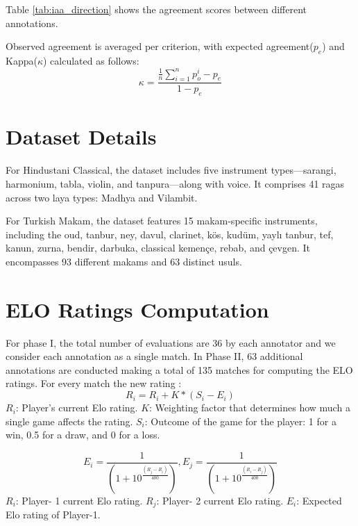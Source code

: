Table \ref{tab:iaa_direction} shows the agreement scores between different annotations.


Observed agreement is averaged per criterion, with expected agreement(\(p_e\)) and Kappa(\(\kappa\)) calculated as follows:
\begin{equation*}
\kappa = \frac{\frac{1}{n} \sum_{i=1}^{n} p_o^i - p_e}{1 - p_e}
\end{equation*}



\section{Dataset Details} \label{appendix:dataset_details}
For Hindustani Classical, the dataset includes five instrument types—sarangi, harmonium, tabla, violin, and tanpura—along with voice. It comprises 41 ragas across two laya types: Madhya and Vilambit.

For Turkish Makam, the dataset features 15 makam-specific instruments, including the oud, tanbur, ney, davul, clarinet, kös, kudüm, yaylı tanbur, tef, kanun, zurna, bendir, darbuka, classical kemençe, rebab, and çevgen. It encompasses 93 different makams and 63 distinct usuls.


\section{ELO Ratings Computation} \label{appendix:elo}
For phase I, the total number of evaluations are 36 by each annotator and we consider each annotation as a single match. In Phase II, 63 additional annotations are conducted making a total of 135 matches for computing the ELO ratings. For every match the new rating : 
\begin{equation*}
R_i = R_i + K * (S_i - E_i)
\end{equation*}
$R_i$: Player's current Elo rating.\newline
$K$: Weighting factor that determines how much a single game affects the rating. \newline
$S_i$: Outcome of the game for the player: 1 for a win, 0.5 for a draw, and 0 for a loss.

\begin{equation*}
    E_i = \frac{1}{(1 + 10^{\frac{(R_j - R_i)}{400}})}
    , E_j = \frac{1}{(1 + 10^{\frac{(R_i - R_j)}{400}})}
\end{equation*}
$R_i$: Player- 1 current Elo rating.\newline
$R_j$: Player- 2 current Elo rating.\newline
$E_i$: Expected Elo rating of Player-1.

